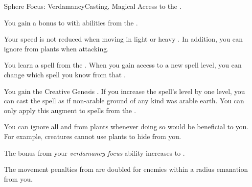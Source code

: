     \begin{feat}{Sphere Focus: Verdamancy}{Casting, Magical}
        \featpre Access to the  .

         You gain a  bonus to  with abilities from the  .

         Your speed is not reduced when moving in light or heavy .
        In addition, you can ignore  from plants when attacking.

         You learn a spell from the  .
        When you gain access to a new spell level, you can change which spell you know from that .

         You gain the Creative Genesis .
        If you increase the spell's level by one level, you can cast the spell as if non-arable ground of any kind was arable earth.
        You can only apply this augment to spells from the  .

         You can ignore all  and  from plants whenever doing so would be beneficial to you.
        For example, creatures cannot use plants to hide from you.

         The bonus from your \textit{verdamancy focus} ability increases to .

         The movement penalties from  are doubled for enemies within a \areahuge radius emanation from you.
    \end{feat}

